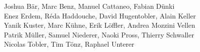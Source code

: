 %
%
%
Joshua Bär,			%
Marc Benz,			%
Manuel Cattaneo,		%
Fabian Dünki%
\\
Enez Erdem,			%
Réda Haddouche,			%
David Hugentobler,		%
Alain Keller%
\\
Yanik Kuster,			%
Marc Kühne,			%
Erik Löffler,			%
Andrea Mozzini Vellen%
\\
Patrik Müller,			%
Samuel Niederer,		%
Naoki Pross,			%
Thierry Schwaller%
\\
Nicolas Tobler,			%
Tim Tönz,			%
Raphael Unterer

